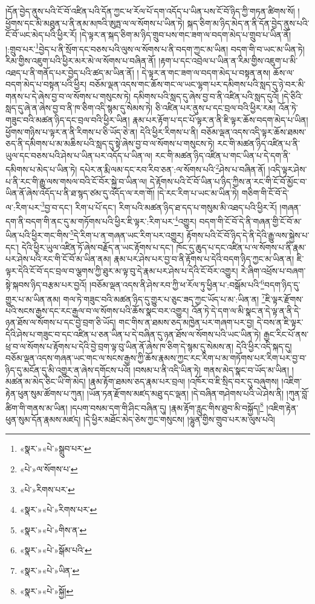 །དོན་བྱེད་ནུས་པའི་ངོ་བོ་འཛིན་པའི་དོན་ཀྱང་ཕ་རོལ་པོ་དག་འདོད་པ་ཡིན་པས་ངོ་བོ་ཉིད་ཀྱི་གཏན་ཚིགས་སོ། །ཕྱོགས་དང་མི་མཐུན་པ་ནི་ནམ་མཁའི་ཨུཏྤ་ལ་ལ་སོགས་པ་ཡིན་ཏེ། སྐད་ཅིག་མ་ཉིད་མེད་ན་ནི་དོན་བྱེད་ནུས་པའི་ངོ་བོ་ཡང་མེད་པའི་ཕྱིར་རོ། །དེ་ལྟར་ན་སྐད་ཅིག་མ་ཉིད་གྲུབ་པས་གང་ཟག་ལ་བདག་མེད་པ་གྲུབ་པ་ཡིན་ནོ། །:གྲུབ་པར་\footnote{«སྣར་»«པེ་»སྒྲུབ་པར་}བྱེད་པ་ནི་སྲོག་དང་བཅས་པའི་ལུས་ལ་སོགས་པ་ནི་བདག་ཀྱང་མ་ཡིན། བདག་གི་བ་ཡང་མ་ཡིན་ཏེ། རིམ་གྱིས་འཇུག་པའི་ཕྱིར་མར་མེ་ལ་སོགས་པ་བཞིན་ནོ། །རྟག་པ་དང་འབྲེལ་པ་ཡིན་ན་རིམ་གྱིས་འཇུག་པ་མི་འཐད་པ་ནི་གནོད་པར་བྱེད་པའི་ཚད་མ་ཡིན་ནོ། །
དེ་ལྟར་ན་གང་ཟག་ལ་བདག་མེད་པ་བསྟན་ནས། ཆོས་ལ་བདག་མེད་པ་བསྟན་པའི་ཕྱིར། བཅོམ་ལྡན་འདས་གང་ཆོས་གང་ལ་ཡང་ལྷག་པར་དམིགས་པའི་སླད་དུ་ཉེ་བར་མི་གནས་པ་དེ་ཞེས་བྱ་བ་ལ་སོགས་པ་གསུངས་ཏེ། དམིགས་པའི་སླད་དུ་ཞེས་བྱ་བ་ནི་འཛིན་པའི་སླད་དུའོ། །དེ་ཅིའི་སླད་དུ་ཞེ་ན་ཞེས་བྱ་བ་ནི་ཁ་ཅིག་འདི་སྙམ་དུ་སེམས་ཏེ། ཅི་འཛིན་པར་ནུས་པ་དང་བྲལ་བའི་ཕྱིར་རམ། འོན་ཏེ་གཟུང་བའི་མཚན་ཉིད་དང་བྲལ་བའི་ཕྱིར་ཡིན། རྣམ་པར་རྟོག་པ་དང་པོ་ལྟར་ན་ནི་ཇི་ལྟར་ཆོས་བདག་མེད་པ་ཡིན། ཕྱོགས་གཉིས་པ་ལྟར་ན་ནི་རིགས་པ་ཅི་ཡོད་ཅེ་ན། དེའི་ཕྱིར་རིགས་པ་ནི། བཅོམ་ལྡན་འདས་འདི་ལྟར་ཆོས་ཐམས་ཅད་ནི་དམིགས་པ་མ་མཆིས་པའི་སླད་དུ་སྟེ་ཞེས་བྱ་བ་ལ་སོགས་པ་གསུངས་ཏེ། རང་གི་མཚན་ཉིད་འཛིན་པ་ནི་ཡུལ་དང་བཅས་པའི་ཤེས་པ་ཡིན་པར་འདོད་པ་ཡིན་ལ། རང་གི་མཚན་ཉིད་འཛིན་པ་གང་ཡིན་པ་དེ་དག་ནི་དམིགས་པ་མེད་པ་ཡིན་ཏེ། དཔེར་ན་རྨི་ལམ་དང་རབ་རིབ་ཅན་:ལ་སོགས་པའི་\footnote{«པེ་»ལ་སོགས་པ་}ཤེས་པ་བཞིན་ནོ། །འདི་ལྟར་ཤེས་པ་ནི་རང་གི་རྒྱུ་ལས་གསལ་བའི་ངོ་བོར་སྐྱེ་བ་ཡིན་ལ། དེ་རྟོགས་པའི་ངོ་བོ་ཡིན་པ་ཉིད་ཀྱིས་ན་རང་གི་ངོ་བོ་མྱོང་བ་ཡིན་ནོ་ཞེས་འདོད་པ་ནི་ཐ་སྙད་ཙམ་དུ་འདོད་ལ་རག་གོ། །དེ་རང་རིག་པ་ཡང་མ་ཡིན་ཏེ། གཅིག་གི་ངོ་བོ་དེ་ལ་:རིག་པར་\footnote{«པེ་»རིགས་པར་}བྱ་བ་དང་། རིག་པ་པོ་དང་། རིག་པའི་མཚན་ཉིད་ཐ་དད་པ་གསུམ་མི་འཐད་པའི་ཕྱིར་རོ། །གཞན་དག་ནི་བདག་གི་ནང་དུ་མ་གཏོགས་པའི་ཕྱིར་ཇི་ལྟར་:རིག་པར་\footnote{«སྣར་»«པེ་»རིགས་པར་}འགྱུར། བདག་གི་ངོ་བོ་དེ་ནི་གཞན་གྱི་ངོ་བོ་མ་ཡིན་པའི་ཕྱིར་གང་གིས་\footnote{«སྣར་»«པེ་»གིས་ན་}དེ་རིག་པ་ན་གཞན་ཡང་རིག་པར་འགྱུར། རྟོགས་པའི་ངོ་བོ་ཉིད་དེ་ནི་དེའི་རྒྱུ་ལས་སྐྱེས་པ་དང་། དེའི་ཕྱིར་ཡུལ་འཛིན་ཏོ་ཞེས་བརྗོད་ན་ཡང་རྟོགས་པ་དང་། ཁོང་དུ་ཆུད་པ་དང་འཛིན་པ་ལ་སོགས་པ་ནི་རྣམ་པར་ཤེས་པའི་རང་གི་ངོ་བོ་མ་ཡིན་ནམ། རྣམ་པར་ཤེས་པར་བྱ་བ་ནི་རྟོགས་པ་དེའི་བདག་ཉིད་ཀྱང་མ་ཡིན་ན། ཇི་ལྟར་དེའི་ངོ་བོ་དང་བྲལ་བ་ལྕགས་ཀྱི་ཐུར་མ་ལྟ་བུ་དེ་རྣམ་པར་ཤེས་པ་དེའི་ངོ་བོར་འགྱུར། རེ་ཞིག་འཕྲོས་པ་བཞག་སྟེ་སྐབས་ཉིད་བརྩམ་པར་བྱའོ། །བཅོམ་ལྡན་འདས་ནི་ཤེས་རབ་ཀྱི་ཕ་རོལ་ཏུ་ཕྱིན་པ་:བསྒོམ་པའི་\footnote{«སྣར་»«པེ་»སྒོམ་པའི་}བདག་ཉིད་དུ་གྱུར་པ་མ་ཡིན་ནམ། གལ་ཏེ་གཟུང་བའི་མཚན་ཉིད་དུ་གྱུར་པ་ཅུང་ཟད་ཀྱང་ཡོད་པ་མ་:ཡིན་ན། \footnote{«སྣར་»«པེ་»ཡིན་}ཇི་ལྟར་རྫོགས་པའི་སངས་རྒྱས་དང་རང་རྒྱལ་བ་ལ་སོགས་པའི་ཆོས་སྣང་བར་འགྱུར། འོན་ཏེ་དེ་དག་ལ་མི་སྣང་ན་དེ་ལྟ་ན་ནི་དེ་ཉན་ཐོས་ལ་སོགས་པ་དང་བྱེ་བྲག་ཅི་ཡོད། གང་གིས་ན་ཐམས་ཅད་མཁྱེན་པར་གཞག་པར་བྱ། དེ་བས་ན་ཇི་ལྟར་དེའི་ཤེས་པ་གཟུང་བ་དང་འཛིན་པ་ཅན་ཡིན་པ་དེ་བཞིན་དུ་ཉན་ཐོས་ལ་སོགས་པའི་ཡང་ཡིན་ཏེ། རྒྱང་རིང་པོ་ནས་ཕྲ་བ་ལ་སོགས་པ་རྟོགས་པ་དེའི་བྱེ་བྲག་ལྟ་བུ་ཡིན་ནོ་ཞེས་ཁ་ཅིག་དེ་སྙམ་དུ་སེམས་ན། དེའི་ཕྱིར་འདི་སྐད་དུ། བཅོམ་ལྡན་འདས་གཞན་ཡང་གང་ལ་སངས་རྒྱས་ཀྱི་ཆོས་རྣམས་ཀྱང་རང་རིག་པ་མ་གཏོགས་པར་རིག་པར་བྱ་བ་ཉིད་དུ་མངོན་དུ་མི་འགྱུར་ན་ཞེས་དགོངས་པའོ། །བསམ་པ་ནི་འདི་ཡིན་ཏེ། གནས་མེད་སྣང་བ་ཡོད་མ་ཡིན། །མཚན་མ་མེད་ཅིང་ཡི་གེ་མེད། །རྣམ་རྟོག་ཐམས་ཅད་རྣམ་པར་བྲལ། །འཁོར་བ་ཇི་སྲིད་བར་དུ་བཞུགས། །འཇིག་རྟེན་ཕུན་སུམ་ཚོགས་པ་ཀུན། །ཡོན་ཏན་རྫོགས་མཛད་མཐུ་དང་ལྡན། །དེ་བཞིན་གཤེགས་པའི་ཡེ་ཤེས་ནི། །ཀུན་བློ་ཚིག་གི་གནས་མ་ཡིན། །དཔག་བསམ་དག་གི་ཤིང་བཞིན་དུ། །རྣམ་རྟོག་རླུང་གིས་ཐུབ་མི་བསྐྱོད།\footnote{«སྣར་»«པེ་»སྐྱོ།} །འཇིག་རྟེན་ཕུན་སུམ་དོན་རྣམས་མཛད། །དེ་ཕྱིར་མཐོང་མེད་ཅེས་ཀྱང་གསུངས། །ལྷུན་གྱིས་གྲུབ་པར་མ་ལུས་པའི། 